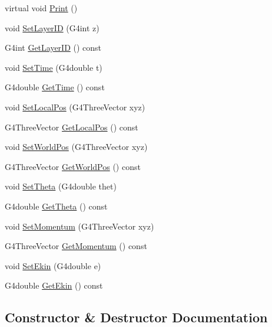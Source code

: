 \begin{DoxyCompactItemize}
\item 
virtual void \hyperlink{classEMMADriftChamberHit_a45fe874659cbba33a958001146b444e0}{Print} ()
\item 
void \hyperlink{classEMMADriftChamberHit_a28e5225503b9532c1abe8857c94baf6e}{Set\+Layer\+ID} (G4int z)
\item 
G4int \hyperlink{classEMMADriftChamberHit_a3c9c24a77ffe84c78f8f14cbe310bdc2}{Get\+Layer\+ID} () const 
\item 
void \hyperlink{classEMMADriftChamberHit_a6517b8baa2c66b9ac72897cb736639f4}{Set\+Time} (G4double t)
\item 
G4double \hyperlink{classEMMADriftChamberHit_acfe405f07e4bab5a9a75d14fc9b60da4}{Get\+Time} () const 
\item 
void \hyperlink{classEMMADriftChamberHit_a46cc71e2a94bea73d7d97b321e08c7b7}{Set\+Local\+Pos} (G4\+Three\+Vector xyz)
\item 
G4\+Three\+Vector \hyperlink{classEMMADriftChamberHit_a7442c06eb3743d5c9f98da9f8d20b406}{Get\+Local\+Pos} () const 
\item 
void \hyperlink{classEMMADriftChamberHit_afdd902edbb9e0602ab70977429fab8dd}{Set\+World\+Pos} (G4\+Three\+Vector xyz)
\item 
G4\+Three\+Vector \hyperlink{classEMMADriftChamberHit_a3aeebdef7a99928719264d6e79470e0c}{Get\+World\+Pos} () const 
\item 
void \hyperlink{classEMMADriftChamberHit_af6750d015a798ed2dc6b9b373b6d4c09}{Set\+Theta} (G4double thet)
\item 
G4double \hyperlink{classEMMADriftChamberHit_a83127842be3fb0d42cd8c41e74fc2428}{Get\+Theta} () const 
\item 
void \hyperlink{classEMMADriftChamberHit_a1859de1d41cddb7f6c56d7475e5b7fc4}{Set\+Momentum} (G4\+Three\+Vector xyz)
\item 
G4\+Three\+Vector \hyperlink{classEMMADriftChamberHit_ae4afa0e4d7d3e4d13f454c478cf1c644}{Get\+Momentum} () const 
\item 
void \hyperlink{classEMMADriftChamberHit_a24f9b6729e7ba66679d2e87450294aef}{Set\+Ekin} (G4double e)
\item 
G4double \hyperlink{classEMMADriftChamberHit_ae5219b187a8751d55bbc888444d7faa5}{Get\+Ekin} () const 
\end{DoxyCompactItemize}


\subsection{Constructor \& Destructor Documentation}
